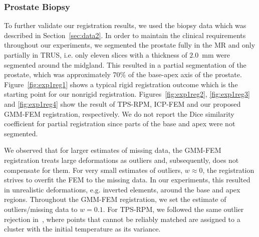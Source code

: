 \documentclass[journal]{IEEEtran}
\begin{document}
\subsubsection{Prostate Biopsy}
To further validate our registration results, we used the biopsy data which was described in Section~\ref{sec:data2}. In order to maintain the clinical requirements throughout our experiments, we segmented the prostate fully in the MR and only partially in TRUS, i.e. only eleven slices with a thickness of $2.0$~mm were segmented around the midgland. This resulted in a partial segmentation of the prostate, which was approximately 70\% of the base-apex axis of the prostate. Figure~\ref{fig:exp1reg1} shows a typical rigid registration outcome which is the starting point for our nonrigid registration. Figures~\ref{fig:exp1reg2}, \ref{fig:exp1reg3} and \ref{fig:exp1reg4} show the result of TPS-RPM, ICP-FEM and our proposed GMM-FEM registration, respectively. We do not report the Dice similarity coefficient for partial registration since parts of the base and apex were not segmented.

We observed that for larger estimates of missing data, the GMM-FEM registration treats large deformations as outliers and, subsequently, does not compensate for them. For very small estimates of outliers, $w\approx0$, the registration strives to overfit the FEM to the missing data. In our experiments, this resulted in unrealistic deformations, e.g. inverted elements, around the base and apex regions. Throughout the GMM-FEM registration, we set the estimate of outliers/missing data to $w=0.1$. For TPS-RPM, we followed the same outlier rejection in~\cite{Chui03a}, where points that cannot be reliably matched are assigned to a cluster with the initial temperature as its variance.
\end{document}
